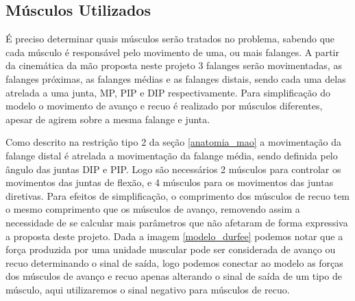 \subsection{Músculos Utilizados}
É preciso determinar quais músculos serão tratados no problema, sabendo que cada músculo é responsável pelo movimento de uma, ou mais falanges. A partir da cinemática da mão proposta neste projeto 3 falanges serão movimentadas, as falanges próximas, as falanges médias e as falanges distais, sendo cada uma delas atrelada a uma junta, MP, PIP e DIP respectivamente. Para simplificação do modelo o movimento de avanço e recuo é realizado por músculos diferentes, apesar de agirem sobre a mesma falange e junta. 

Como descrito na restrição tipo 2 da seção \ref{anatomia_mao} a movimentação da falange distal é atrelada a movimentação da falange média, sendo definida pelo ângulo das juntas DIP e PIP. Logo são necessários 2 músculos para controlar os movimentos das juntas de flexão, e 4 músculos para os movimentos das juntas diretivas. Para efeitos de simplificação, o comprimento dos músculos de recuo tem o mesmo comprimento que os músculos de avanço, removendo assim a necessidade de se calcular mais parâmetros que não afetaram de forma expressiva a proposta deste projeto. Dada a imagem \ref{modelo_durfee} podemos notar que a força produzida por uma unidade muscular pode ser considerada de avanço ou recuo determinando o sinal de saída, logo podemos conectar ao modelo as forças dos músculos de avanço e recuo apenas alterando o sinal de saída de um tipo de músculo, aqui utilizaremos o sinal negativo para músculos de recuo.

